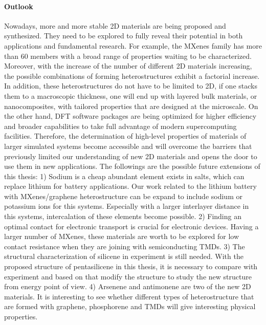 \paragraph{Outlook} Nowadays, more and more stable 2D materials are being proposed and synthesized. They need to be explored to fully reveal their potential in both applications and fundamental research. For example, the MXenes family has more than 60 members with a broad range of properties waiting to be characterized. Moreover, with the increase of the number of different 2D materials increasing, the possible combinations of forming heterostructures exhibit a factorial increase. In addition, these heterostructures do not have to be limited to 2D, if one stacks them to a macroscopic thickness, one will end up with layered bulk materials, or nanocomposites, with tailored properties that are designed at the microscale. On the other hand, DFT software packages are being optimized for higher efficiency and broader capabilities to take full advantage of modern supercomputing facilities. Therefore, the determination of high-level properties of materials of larger simulated systems become accessible and will overcome the barriers that previously limited our understanding of new 2D materials and opens the door to use them in new applications. The followings are the possible future extensions of this thesis: 1) Sodium is a cheap abundant element exists in salts, which can replace lithium for battery applications. Our work related to the lithium battery with MXenes/graphene heterostructure can be expand to include sodium or potassium ions for this systems. Especially with a larger interlayer distance in this systems, intercalation of these elements become possible. 2) Finding an optimal contact for electronic transport is crucial for electronic devices. Having a larger number of MXenes, these materials are worth to be explored for low contact resistance when they are joining with semiconducting TMDs. 3) The structural characterization of silicene in experiment is still needed. With the proposed structure of pentasilicene in this thesis, it is necessary to compare with experiment and based on that modify the structure to study the new structure from energy point of view. 4) Arsenene\cite{Kamal2015} and antimonene\cite{Singh2016} are two of the new 2D materials. It is interesting to see whether different types of heterostructure that are formed with graphene, phosphorene and TMDs will give interesting physical properties.